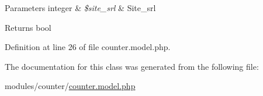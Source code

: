 \begin{DoxyParams}[1]{Parameters}
integer & {\em \$site\-\_\-srl} & Site\-\_\-srl \\
\hline
\end{DoxyParams}
\begin{DoxyReturn}{Returns}
bool 
\end{DoxyReturn}


Definition at line 26 of file counter.\-model.\-php.



The documentation for this class was generated from the following file\-:\begin{DoxyCompactItemize}
\item 
modules/counter/\hyperlink{counter_8model_8php}{counter.\-model.\-php}\end{DoxyCompactItemize}
